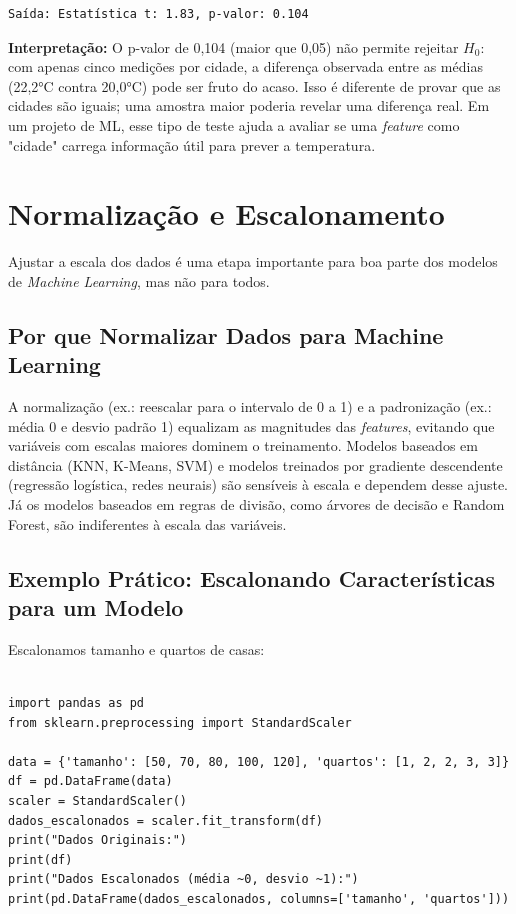\documentclass[a4paper,12pt,openany]{book}
\begin{document}
\begin{verbatim}
Saída: Estatística t: 1.83, p-valor: 0.104
\end{verbatim}

\textbf{Interpretação:} O p-valor de 0,104 (maior que 0,05) não permite rejeitar $H_0$: com apenas cinco medições por cidade, a diferença observada entre as médias (22,2°C contra 20,0°C) pode ser fruto do acaso. Isso é diferente de provar que as cidades são iguais; uma amostra maior poderia revelar uma diferença real. Em um projeto de ML, esse tipo de teste ajuda a avaliar se uma \textit{feature} como "cidade" carrega informação útil para prever a temperatura.

\section{Normalização e Escalonamento}
Ajustar a escala dos dados é uma etapa importante para boa parte dos modelos de \textit{Machine Learning}, mas não para todos.

\subsection{Por que Normalizar Dados para Machine Learning}
A normalização (ex.: reescalar para o intervalo de 0 a 1) e a padronização (ex.: média 0 e desvio padrão 1) equalizam as magnitudes das \textit{features}, evitando que variáveis com escalas maiores dominem o treinamento. Modelos baseados em distância (KNN, K-Means, SVM) e modelos treinados por gradiente descendente (regressão logística, redes neurais) são sensíveis à escala e dependem desse ajuste. Já os modelos baseados em regras de divisão, como árvores de decisão e Random Forest, são indiferentes à escala das variáveis.

\subsection{Exemplo Prático: Escalonando Características para um Modelo}
Escalonamos tamanho e quartos de casas:

\begin{verbatim}
    
import pandas as pd
from sklearn.preprocessing import StandardScaler

data = {'tamanho': [50, 70, 80, 100, 120], 'quartos': [1, 2, 2, 3, 3]}
df = pd.DataFrame(data)
scaler = StandardScaler()
dados_escalonados = scaler.fit_transform(df)
print("Dados Originais:")
print(df)
print("Dados Escalonados (média ~0, desvio ~1):")
print(pd.DataFrame(dados_escalonados, columns=['tamanho', 'quartos']))
\end{verbatim}
\end{document}
